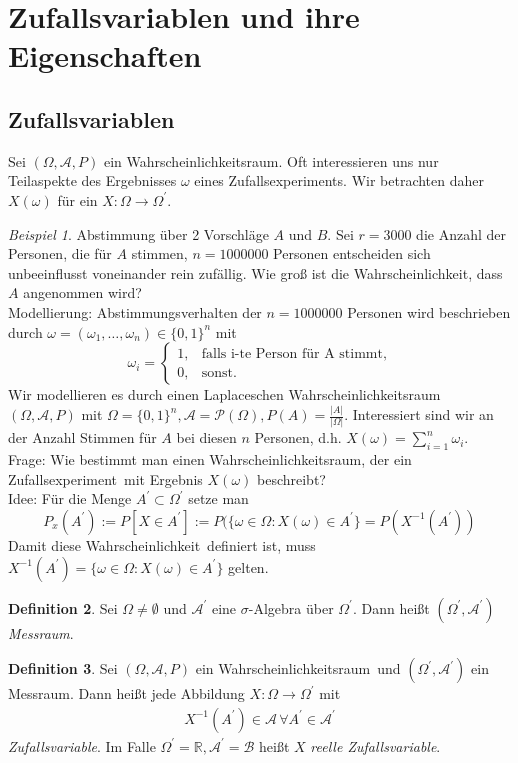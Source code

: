 \documentclass[a4paper,12pt,fleqn]{scrartcl}
\newcommand{\R}{\mathbb{R}}
\newcommand{\m}[1]{\mathcal{ #1 }}
\newcommand{\ZE}{Zufallsexperiment}
\newcommand{\WR}{Wahrscheinlichkeitsraum}
\newcommand{\Wk}{Wahrscheinlichkeit}
\newcommand{\ZV}{Zufallsvariable}
\theoremstyle{definition}
\newtheorem{definition}{Definition}[section]
\theoremstyle{plain}
\theoremstyle{remark}
\newtheorem{beispiel}[definition]{Beispiel}
\begin{document}
\section{Zufallsvariablen und ihre Eigenschaften}
\subsection{Zufallsvariablen}
Sei $( \Omega , \m{A} , P)$ ein \WR. Oft interessieren uns nur Teilaspekte des Ergebnisses $\omega$ eines \ZE s. Wir betrachten daher $X( \omega ) $ für ein $X : \Omega \rightarrow \Omega^\prime$.
\begin{beispiel}
Abstimmung über 2 Vorschläge $A$ und $B$. Sei $r=3000$ die Anzahl der Personen, die für $A$ stimmen, $n=1000000$ Personen entscheiden sich unbeeinflusst voneinander rein zufällig. Wie groß ist die \Wk, dass $A$ angenommen wird? \\
Modellierung: Abstimmungsverhalten der $n=1000000$ Personen wird beschrieben durch $\omega = ( \omega_1, \ldots , \omega_n) \in \{ 0,1 \}^n$ mit 
\[\omega_i =\begin{cases}1,&\text{falls i-te Person für A stimmt,}\\0,&\text{sonst.}\end{cases}\]
Wir modellieren es durch einen Laplaceschen \WR \, $(\Omega , \m{A} , P)$ mit $ \Omega = \{ 0,1 \}^n , \m{A} = \m{P}(\Omega) , P(A) = \frac{|A|}{| \Omega|}$. Interessiert sind wir an der Anzahl Stimmen für $A$ bei diesen $n$ Personen, d.h. $X( \omega) = \sum_{i=1}^{n}{ \omega_i }$. \\
Frage: Wie bestimmt man einen \WR, der ein \ZE \, mit Ergebnis $X( \omega)$ beschreibt? \\
Idee: Für die Menge $A^\prime \subset \Omega^\prime$ setze man 
\[P_x(A^\prime) := P[X \in A^\prime] := P( \{ \omega \in \Omega : X( \omega ) \in A^\prime \} = P(X^{-1}(A^\prime))\]
Damit diese \Wk \, definiert ist, muss $X^{-1}(A^\prime) = \{ \omega \in \Omega : X( \omega ) \in A^\prime \}$ gelten.
\end{beispiel}
\begin{definition}
Sei $\Omega \neq \emptyset$ und $\m{A}^\prime$ eine $\sigma$-Algebra über $\Omega^\prime$. Dann heißt $(\Omega^\prime, \m{A}^\prime)$ \emph{Messraum}.
\end{definition}
\begin{definition}
Sei $( \Omega , \m{A} , P)$ ein \WR \, und $(\Omega^\prime, \m{A}^\prime)$ ein Messraum. Dann heißt jede Abbildung $X: \Omega \rightarrow \Omega^\prime$ mit
\begin{align*}
 X^{-1}(A^\prime) \in \m{A} \, \forall A^\prime \in \m{A}^\prime \tag{*}
\end{align*} 
\emph{Zufallsvariable}. Im Falle $\Omega^\prime = \R, \m{A}^\prime = \m{B}$ heißt $X$ \emph{reelle \ZV}.
\end{definition}
\end{document}

